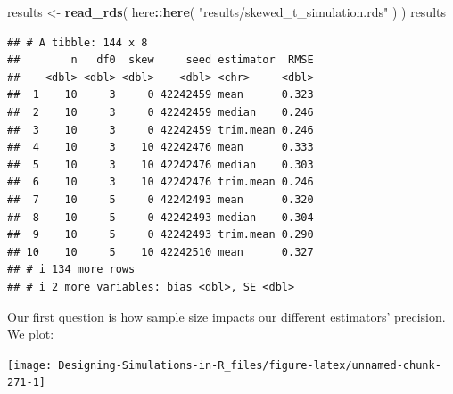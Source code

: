 \documentclass[
]{book}
\newenvironment{Shaded}{\begin{snugshade}}{\end{snugshade}}
\newcommand{\AttributeTok}[1]{\textcolor[rgb]{0.13,0.29,0.53}{#1}}
\newcommand{\FunctionTok}[1]{\textcolor[rgb]{0.13,0.29,0.53}{\textbf{#1}}}
\newcommand{\NormalTok}[1]{#1}
\newcommand{\OtherTok}[1]{\textcolor[rgb]{0.56,0.35,0.01}{#1}}
\newcommand{\SpecialCharTok}[1]{\textcolor[rgb]{0.81,0.36,0.00}{\textbf{#1}}}
\newcommand{\StringTok}[1]{\textcolor[rgb]{0.31,0.60,0.02}{#1}}
\begin{document}
\begin{Shaded}
\begin{Highlighting}[]
\NormalTok{results }\OtherTok{\textless{}{-}} \FunctionTok{read\_rds}\NormalTok{( here}\SpecialCharTok{::}\FunctionTok{here}\NormalTok{( }\StringTok{"results/skewed\_t\_simulation.rds"}\NormalTok{ ) )}
\NormalTok{results}
\end{Highlighting}
\end{Shaded}

\begin{verbatim}
## # A tibble: 144 x 8
##        n   df0  skew     seed estimator  RMSE
##    <dbl> <dbl> <dbl>    <dbl> <chr>     <dbl>
##  1    10     3     0 42242459 mean      0.323
##  2    10     3     0 42242459 median    0.246
##  3    10     3     0 42242459 trim.mean 0.246
##  4    10     3    10 42242476 mean      0.333
##  5    10     3    10 42242476 median    0.303
##  6    10     3    10 42242476 trim.mean 0.246
##  7    10     5     0 42242493 mean      0.320
##  8    10     5     0 42242493 median    0.304
##  9    10     5     0 42242493 trim.mean 0.290
## 10    10     5    10 42242510 mean      0.327
## # i 134 more rows
## # i 2 more variables: bias <dbl>, SE <dbl>
\end{verbatim}

Our first question is how sample size impacts our different estimators' precision.
We plot:

\begin{Shaded}
\end{Shaded}

\begin{center}\texttt{[image: Designing-Simulations-in-R\_files/figure-latex/unnamed-chunk-271-1]} \end{center}
\end{document}
